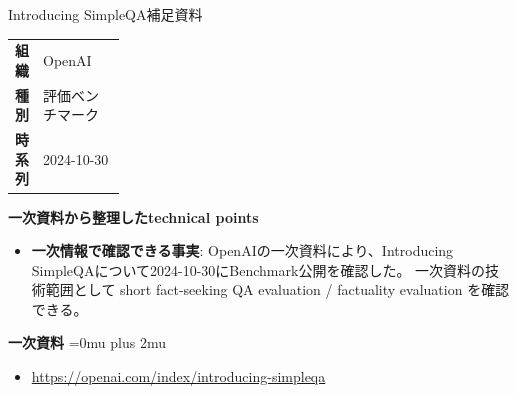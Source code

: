 \begin{technicalnote}{Introducing SimpleQA}{補足資料}
\begingroup
\begin{tabularx}{\linewidth}{@{}>{\bfseries}p{0.22\linewidth}X@{}}
組織 & OpenAI \\
種別 & 評価ベンチマーク \\
時系列 & 2024-10-30 \\
\end{tabularx}
\smallskip
{\bfseries 一次資料から整理したtechnical points}
\begin{itemize}[leftmargin=1.5em,itemsep=0.35em]
\item \textbf{一次情報で確認できる事実}: OpenAIの一次資料により、Introducing SimpleQAについて2024-10-30にBenchmark公開を確認した。 一次資料の技術範囲として short fact-seeking QA evaluation / factuality evaluation を確認できる。
\end{itemize}
\begin{minipage}{\linewidth}
\begin{samepage}
{\bfseries 一次資料}
\begingroup\sloppy
\Urlmuskip=0mu plus 2mu\relax
\begin{itemize}[leftmargin=1.5em,itemsep=0.25em]
\item {\scriptsize\url{https://openai.com/index/introducing-simpleqa}}
\end{itemize}
\endgroup
\end{samepage}
\end{minipage}
\endgroup
\end{technicalnote}
\medskip

